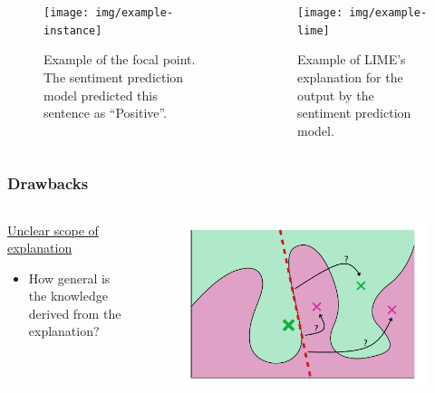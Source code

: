 \documentclass[aspectratio=169]{slide-en}
\begin{document}
\begin{frame}{}
  \begin{columns}[]
    \begin{column}{0.35\textwidth}
      \vspace{5.5em}
      \begin{figure}
        \texttt{[image: img/example-instance]}
        \vspace{1.0em}
        \caption{%
          Example of the focal point.
          The sentiment prediction model predicted this sentence as ``Positive''.
        }
      \end{figure}
    \end{column}
    \begin{column}{0.4\textwidth}
      \begin{figure}
        \texttt{[image: img/example-lime]}
        \caption{%
          Example of LIME's explanation for the output
          by the sentiment prediction model.
        }
      \end{figure}
    \end{column}
  \end{columns}
\end{frame}

\subsubsection{Drawbacks}

\begin{frame}{}
  \begin{columns}[]
    \begin{column}{0.4\textwidth}
      \underline{Unclear scope of explanation}

      \bigskip
      \begin{itemize}
        \item How general is the knowledge derived from the explanation?
      \end{itemize}
    \end{column}
    \begin{column}{0.45\textwidth}
      \begin{figure}
        \includegraphics[width=\textwidth]{lime_drawback}
      \end{figure}
    \end{column}
  \end{columns}
\end{frame}
\end{document}
